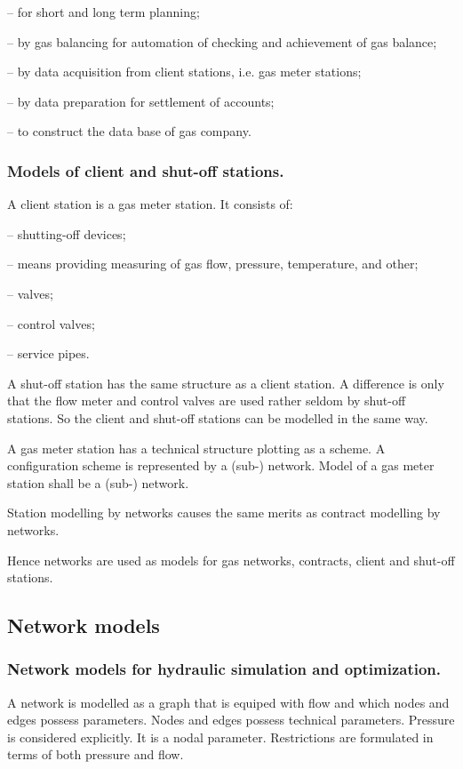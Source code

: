 \documentclass{article}
\begin{document}
\qquad -- for short and long term planning;

\qquad -- by gas balancing for automation of checking and achievement of gas
balance;

\qquad -- by data acquisition from client stations, i.e. gas meter stations;

\qquad -- by data preparation for settlement of accounts;

\qquad -- to construct the data base of gas company.

\subsubsection{Models of client and shut-off stations.}

A client station is a gas meter station. It consists of:

\qquad -- shutting-off devices;

\qquad -- means providing measuring of gas flow, pressure, temperature, and
other;

\qquad -- valves;

\qquad -- control valves;

\qquad -- service pipes.

A shut-off station has the same structure as a client station. A difference
is only that the flow meter and control valves are used rather seldom by
shut-off stations. So the client and shut-off stations can be modelled in
the same way.

A gas meter station has a technical structure plotting as a scheme. A
configuration scheme is represented by a (sub-) network. Model of a gas
meter station shall be a (sub-) network.

Station modelling by networks causes the same merits as contract modelling
by networks.

Hence networks are used as models for gas networks, contracts, client and
shut-off stations.

\subsection{Network models}

\subsubsection{Network models for hydraulic simulation and optimization.}

A network is modelled as a graph that is equiped with flow and which nodes
and edges possess parameters. Nodes and edges possess technical parameters.
Pressure is considered explicitly. It is a nodal parameter. Restrictions are
formulated in terms of both pressure and flow.
\end{document}
